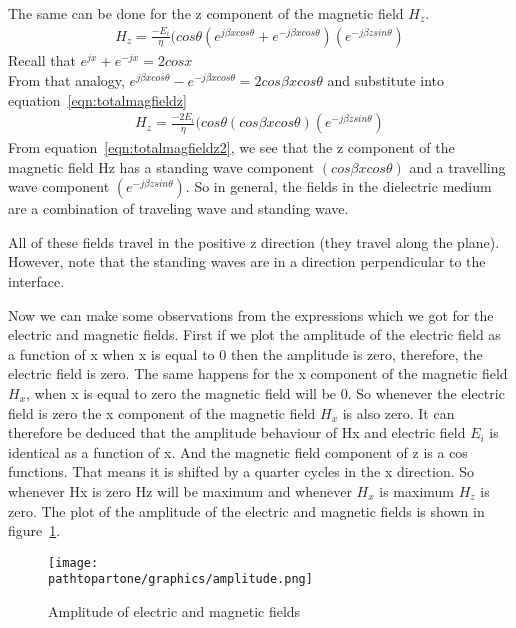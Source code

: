 The same can be done for the z component of the magnetic field $H_z$.
\begin{align}
H_z = \frac{-E_i}{\eta}(cos\theta(e^{j\beta xcos\theta} + e^{-j\beta xcos\theta}) (e^{-j\beta zsin\theta})
\label{eqn:totalmagfieldz}
\end{align}  
Recall that $e^{jx} + e^{-jx} = 2cosx$\\
From that analogy, $e^{j\beta xcos \theta} - e^{-j\beta xcos\theta} = 2cos\beta xcos\theta$ and substitute into equation~\eqref{eqn:totalmagfieldz}
\begin{align}
H_z = \frac{-2E_i}{\eta}(cos\theta(cos\beta xcos\theta) (e^{-j \beta zsin\theta})
\label{eqn:totalmagfieldz2}
\end{align}
From equation~\eqref{eqn:totalmagfieldz2}, we see that the z component of the magnetic field Hz has a standing wave component $(cos\beta xcos\theta)$ and a travelling wave component $(e^{-j\beta zsin\theta})$. So in general, the fields in the dielectric medium are a combination of traveling wave and standing wave.

All of these fields travel in the positive z direction (they travel along the plane). However, note that the standing waves are in a direction perpendicular to the interface.
 
Now we can make some observations from the expressions which we got for the electric and magnetic fields. First if we plot the amplitude of the electric field as a function of x when x is equal to 0 then the amplitude is zero, therefore, the electric field is zero. The same happens for the x component of the magnetic field $H_x$, when x is equal to zero the magnetic field will be 0. So whenever the electric field is zero the x component of the magnetic field $H_x$ is also zero. It can therefore be deduced that the amplitude behaviour of Hx and electric field $E_i$ is identical as a function of x. And the magnetic field component of z is a cos functions. That means it is shifted by a quarter cycles in the x direction. So whenever Hx is zero Hz will be maximum and whenever $H_x$ is maximum $H_z$ is zero. The plot of the amplitude of the electric and magnetic fields is shown in figure~\ref{fig:amplitude}.
\begin{figure}[h]
\centering
\texttt{[image: \\pathtopartone/graphics/amplitude.png]}
\caption{Amplitude of electric and magnetic fields}
\label{fig:amplitude}
\end{figure}

